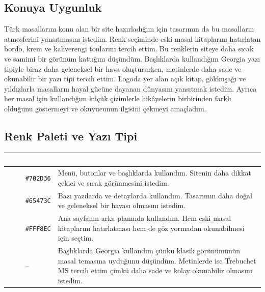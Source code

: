\documentclass[12pt,a4paper]{article}
\begin{document}
\subsection{Konuya Uygunluk}
Türk masallarını konu alan bir site hazırladığım için tasarımın da bu masalların atmosferini yansıtmasını istedim. Renk seçiminde eski masal kitaplarını hatırlatan bordo, krem ve kahverengi tonlarını tercih ettim. Bu renklerin siteye daha sıcak ve samimi bir görünüm kattığını düşündüm. Başlıklarda kullandığım Georgia yazı tipiyle biraz daha geleneksel bir hava oluştururken, metinlerde daha sade ve okunabilir bir yazı tipi tercih ettim. Logoda yer alan açık kitap, gökkuşağı ve yıldızlarla masalların hayal gücüne dayanan dünyasını yansıtmak istedim. Ayrıca her masal için kullandığım küçük çizimlerle hikâyelerin birbirinden farklı olduğunu göstermeyi ve okuyucunun ilgisini çekmeyi amaçladım.

\subsection{Renk Paleti ve Yazı Tipi}
\begin{center}
\begin{tabular}{@{}llp{6.4cm}@{}}
\toprule
\rowcolor{ana}\textcolor{white}{\textbf{Ad}} & \textcolor{white}{\textbf{Kod}} & \textcolor{white}{\textbf{Nerede / neden kullandınız?}} \\
\midrule
\relax[Bordo] & \texttt{\#702D36} & Menü, butonlar ve başlıklarda kullandım. Sitenin daha dikkat çekici ve sıcak görünmesini istedim. \\
\relax[Kahverengi] & \texttt{\#65473C} & Bazı yazılarda ve detaylarda kullandım. Tasarımın daha doğal ve geleneksel bir havası olmasını istedim. \\
\relax[Krem] & \texttt{\#FFF8EC} & Ana sayfanın arka planında kullandım. Hem eski masal kitaplarını hatırlatması hem de göz yormadan okunabilmesi için seçtim. \\
 & -- & Başlıklarda Georgia kullandım çünkü klasik görünümünün masal temasına uyduğunu düşündüm. Metinlerde ise Trebuchet MS tercih ettim çünkü daha sade ve kolay okunabilir olmasını istedim. \\
\bottomrule
\end{tabular}
\end{center}
\end{document}
